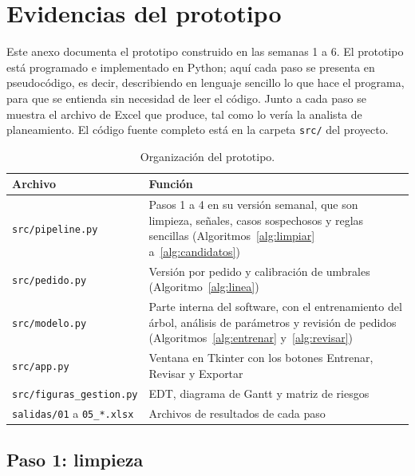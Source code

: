 
\section{Evidencias del prototipo}
\label{sec:anexo}

Este anexo documenta el prototipo construido en las semanas 1 a 6. El prototipo está programado e implementado en Python; aquí cada paso se presenta en pseudocódigo, es decir, describiendo en lenguaje sencillo lo que hace el programa, para que se entienda sin necesidad de leer el código. Junto a cada paso se muestra el archivo de Excel que produce, tal como lo vería la analista de planeamiento. El código fuente completo está en la carpeta \texttt{src/} del proyecto.

\begin{table}[H]
\centering
\caption{Organización del prototipo.}
\label{tab:repo}
\small
\begin{tabularx}{\textwidth}{@{}L{4.2cm}Y@{}}
\toprule
\textbf{Archivo} & \textbf{Función} \\
\midrule
\texttt{src/pipeline.py} & Pasos 1 a 4 en su versión semanal, que son limpieza, señales, casos sospechosos y reglas sencillas (Algoritmos~\ref{alg:limpiar} a~\ref{alg:candidatos}) \\
\texttt{src/pedido.py} & Versión por pedido y calibración de umbrales (Algoritmo~\ref{alg:linea}) \\
\texttt{src/modelo.py} & Parte interna del software, con el entrenamiento del árbol, análisis de parámetros y revisión de pedidos (Algoritmos~\ref{alg:entrenar} y~\ref{alg:revisar}) \\
\texttt{src/app.py} & Ventana en Tkinter con los botones Entrenar, Revisar y Exportar \\
\texttt{src/figuras\_gestion.py} & EDT, diagrama de Gantt y matriz de riesgos \\
\texttt{salidas/01} a \texttt{05\_*.xlsx} & Archivos de resultados de cada paso \\
\bottomrule
\end{tabularx}
\end{table}

\subsection{Paso 1: limpieza}

